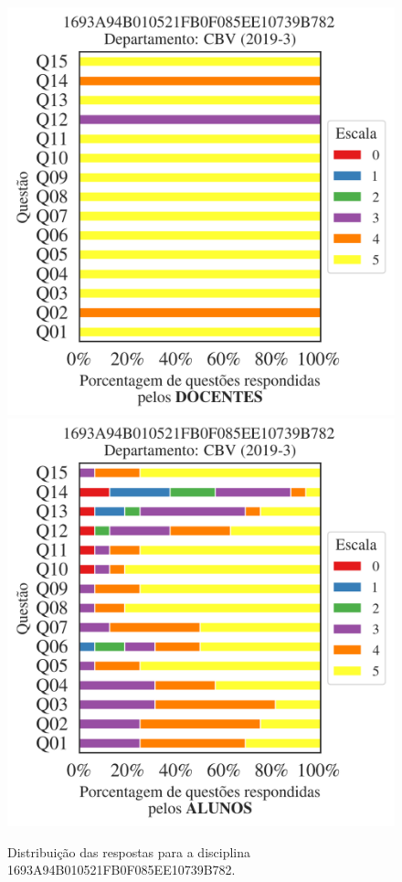 \documentclass[a4paper,10pt]{article}
\begin{document}
\begin{figure}[h]
\centering
\includegraphics[width=0.485\linewidth]{analise_disciplina_departamento_CBV_1693A94B010521FB0F085EE10739B782_docentes.png}
\includegraphics[width=0.485\linewidth]{analise_disciplina_departamento_CBV_1693A94B010521FB0F085EE10739B782_alunos.png}
\caption{\label{fig:analise_geral_departamento}                Distribuição das respostas para a disciplina 1693A94B010521FB0F085EE10739B782. }
\end{figure}
\end{document}
